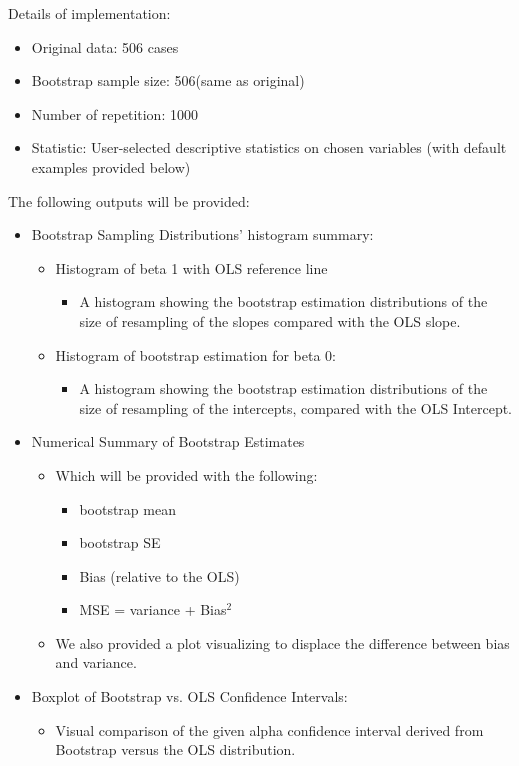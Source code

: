 \documentclass{article}
\begin{document}
        \bigskip %
        \noindent Details of implementation:
        \begin{itemize}
            \item Original data: 506 cases
            \item Bootstrap sample size: 506(same as original)
            \item Number of repetition: 1000
            \item Statistic: User-selected descriptive statistics on chosen variables (with default examples provided below)
        \end{itemize}
        The following outputs will be provided:
        \begin{itemize}
            \item	Bootstrap Sampling Distributions’ histogram summary:
                    \begin{itemize}
            \item	Histogram of beta 1 with OLS reference line
              \begin{itemize}
                \item	A histogram showing the bootstrap estimation distributions of the size of resampling of the slopes compared with the OLS slope. 
              \end{itemize}
              \item	Histogram of bootstrap estimation for beta 0:
            \begin{itemize}
                \item	A histogram showing the bootstrap estimation distributions of the size of resampling of the intercepts, compared with the OLS Intercept.
              \end{itemize}
                    \end{itemize}

            
            \item Numerical Summary of Bootstrap Estimates 
             \begin{itemize}
            \item Which will be provided with the following:
            \begin{itemize}
                \item	bootstrap mean
                \item	bootstrap SE
                \item	Bias (relative to the OLS)
                \item	MSE = variance + Bias$^2$
              \end{itemize}
              \item We also provided a plot visualizing to displace the difference between bias and variance.
            \end{itemize}
            \item	Boxplot of Bootstrap vs. OLS Confidence Intervals:
            \begin{itemize}
                \item	Visual comparison of the given alpha confidence interval derived from Bootstrap versus the OLS distribution.
              \end{itemize}
        \end{itemize}
\end{document}
